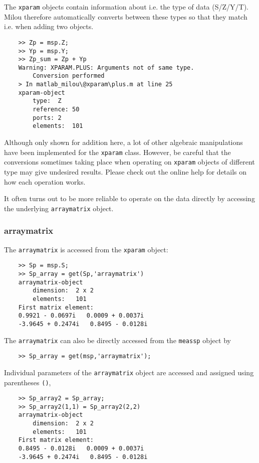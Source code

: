 The \verb"xparam" objects contain information about i.e. the type
of data (S/Z/Y/T). Milou therefore automatically converts between
these types so that they match i.e. when adding two objects.
\begin{small}
\begin{verbatim}
    >> Zp = msp.Z;
    >> Yp = msp.Y;
    >> Zp_sum = Zp + Yp
    Warning: XPARAM.PLUS: Arguments not of same type.
        Conversion performed
    > In matlab_milou\@xparam\plus.m at line 25
    xparam-object
        type:  Z
        reference: 50
        ports: 2
        elements:  101
\end{verbatim}
\end{small}
Although only shown for addition here, a lot of other algebraic
manipulations have been implemented for the \verb"xparam" class.
However, be careful that the conversions sometimes taking place
when operating on \verb"xparam" objects of different type may give
undesired results. Please check out the online help for details on
how each operation works.

It often turns out to be more reliable to operate on the data
directly by accessing the underlying \verb"arraymatrix" object.

\subsubsection{arraymatrix}
The \verb"arraymatrix" is accessed from the \verb"xparam" object:
\begin{small}
\begin{verbatim}
    >> Sp = msp.S;
    >> Sp_array = get(Sp,'arraymatrix')
    arraymatrix-object
        dimension:  2 x 2
        elements:   101
    First matrix element:
    0.9921 - 0.0697i   0.0009 + 0.0037i
    -3.9645 + 0.2474i   0.8495 - 0.0128i
\end{verbatim}
\end{small}
The \verb"arraymatrix" can also be directly accessed from the
\verb"meassp" object by
\begin{small}
\begin{verbatim}
    >> Sp_array = get(msp,'arraymatrix');
\end{verbatim}
\end{small}

Individual parameters of the \verb"arraymatrix" object are
accessed and assigned using parentheses \verb"()",
\begin{small}
\begin{verbatim}
    >> Sp_array2 = Sp_array;
    >> Sp_array2(1,1) = Sp_array2(2,2)
    arraymatrix-object
        dimension:  2 x 2
        elements:   101
    First matrix element:
    0.8495 - 0.0128i   0.0009 + 0.0037i
    -3.9645 + 0.2474i   0.8495 - 0.0128i
\end{verbatim}
\end{small}


